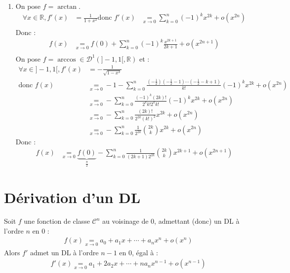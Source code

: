 \documentclass[../main.tex]{subfiles}
\begin{document}
\begin{enumerate}
    \item On pose $f = \arctan$. 
    \begin{align*}
        \forall x \in \mathbb{R}, f'(x) &= \frac{1}{1 + x^2}
        \text{donc } f'(x) &\underset{x\to 0}{=} \sum_{k=0}^{n} (-1)^k x^{2k} + o(x^{2n}) \\
    \end{align*}
    Donc : 
    \begin{align*}
        f(x) &\underset{x\to 0}{=} f(0) + \sum_{k=0}^{n} (-1)^k \frac{x^{2k+1}}{2k+1} + o(x^{2n+1}) \\
    \end{align*}
    On pose $f = \arccos \in \mathcal{D}^1(]-1, 1[, \mathbb{R})$ et : 
    \begin{align*}
        \forall x\in ]-1, 1[, f'(x) &= -\frac{1}{\sqrt{1 - x^2}} \\
        \text{donc } f(x) &\underset{x\to 0}{=} -1 - \sum_{k=0}^{n} \frac{\left( -\frac{1}{2} \right) \left( -\frac{1}{2} - 1 \right) \cdots \left( -\frac{1}{2} - k+1 \right)}{k!} (-1)^k x^{2k} + o(x^{2n}) \\
        &\underset{x\to 0}{=} -\sum_{k=0}^{n} \frac{(-1)^k (2k)!}{2^{k} k! 2^k k!} (-1)^k x^{2k} + o(x^{2n}) \\
        &\underset{x\to 0}{=} -\sum_{k=0}^{n} \frac{(2k)!}{2^{2k} (k!)^2} x^{2k} + o(x^{2n}) \\
        &\underset{x\to 0}{=} -\sum_{k=0}^{n} \frac{1}{2^{2k}} \binom{2k}{k} x^{2k} + o(x^{2n})
    \end{align*}
    Donc : 
    \begin{align*}
        f(x) &\underset{x\to 0}{=} \underbrace{f(0)}_{\frac{\pi}{2}} - \sum_{k=0}^{n} \frac{1}{(2k+1) 2^{2k}} \binom{2k}{k} x^{2k+1} + o(x^{2n+1})
    \end{align*}
\end{enumerate}

\section{Dérivation d'un DL}
\begin{tcolorbox}[title=Propostion 25.74, title filled=false, colframe=lightblue, colback=lightblue!10!white]
    Soit $f$ une fonction de classe $\mathcal{C}^n$ au voisinage de $0$, admettant (donc) un DL à l'ordre $n$ en $0$ : 
    \begin{align*}
        f(x) \underset{x\to 0}{=} a_0 + a_1 x + \cdots + a_n x^n + o(x^n)
    \end{align*}
    Alors $f'$ admet un DL à l'ordre $n-1$ en $0$, égal à : 
    \begin{align*}
        f'(x) \underset{x\to 0}{=} a_1 + 2a_2 x + \cdots + n a_n x^{n-1} + o(x^{n-1})
    \end{align*}
\end{tcolorbox}
\end{document}
